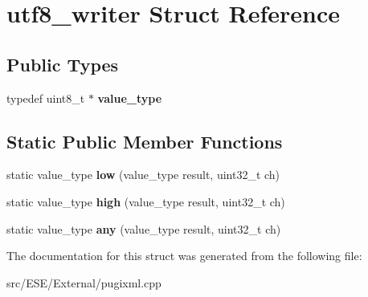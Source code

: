 \hypertarget{structutf8__writer}{\section{utf8\-\_\-writer Struct Reference}
\label{structutf8__writer}
}
\subsection*{Public Types}
\begin{DoxyCompactItemize}
\item 
\hypertarget{structutf8__writer_af25ec3c651f9a4a3f193573a4e95002b}{typedef uint8\-\_\-t $\ast$ {\bfseries value\-\_\-type}}\label{structutf8__writer_af25ec3c651f9a4a3f193573a4e95002b}

\end{DoxyCompactItemize}
\subsection*{Static Public Member Functions}
\begin{DoxyCompactItemize}
\item 
\hypertarget{structutf8__writer_ac4ec52da6f37225ba4fde259bff2f86c}{static value\-\_\-type {\bfseries low} (value\-\_\-type result, uint32\-\_\-t ch)}\label{structutf8__writer_ac4ec52da6f37225ba4fde259bff2f86c}

\item 
\hypertarget{structutf8__writer_ac03dfaf797d599afdf0be7def86ff9b9}{static value\-\_\-type {\bfseries high} (value\-\_\-type result, uint32\-\_\-t ch)}\label{structutf8__writer_ac03dfaf797d599afdf0be7def86ff9b9}

\item 
\hypertarget{structutf8__writer_a288e9c5f3720b95ae6b77330ad38dd56}{static value\-\_\-type {\bfseries any} (value\-\_\-type result, uint32\-\_\-t ch)}\label{structutf8__writer_a288e9c5f3720b95ae6b77330ad38dd56}

\end{DoxyCompactItemize}


The documentation for this struct was generated from the following file\-:\begin{DoxyCompactItemize}
\item 
src/\-E\-S\-E/\-External/pugixml.\-cpp\end{DoxyCompactItemize}
